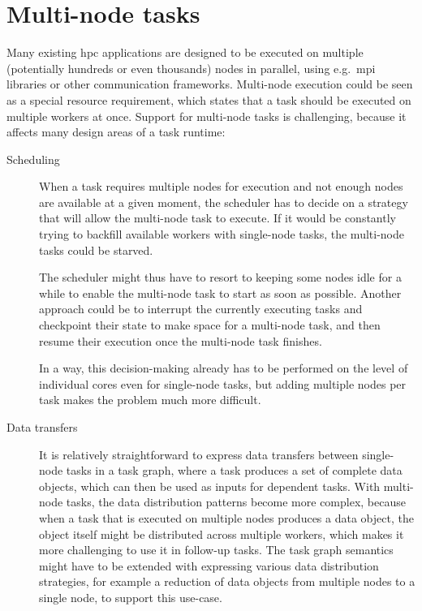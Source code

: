 \section{Multi-node tasks}
Many existing \gls{hpc} applications are designed to be executed on multiple
(potentially hundreds or even thousands) nodes in parallel, using e.g.\ \gls{mpi}
libraries or other communication frameworks. Multi-node execution could be seen as a special
resource requirement, which states that a task should be executed on multiple workers at once.
Support for multi-node tasks is challenging, because it affects many design areas of a task
runtime:
\begin{description}
	\item[Scheduling] When a task requires multiple nodes for execution and not enough nodes are available at a given
		moment, the scheduler has to decide on a strategy that will allow the multi-node task to execute.
		If it would be constantly trying to backfill available workers with single-node tasks, the
		multi-node tasks could be starved.

		The scheduler might thus have to resort to keeping some nodes idle for a while to enable the
		multi-node task to start as soon as possible. Another approach could be to interrupt the currently
		executing tasks and checkpoint their state to make space for a multi-node task, and then resume
		their execution once the multi-node task finishes.

		In a way, this decision-making already has to be performed on the level of individual cores even
		for single-node tasks, but adding multiple nodes per task makes the problem much more difficult.
	\item[Data transfers] It is relatively straightforward to express data transfers between single-node tasks in a task
		graph, where a task produces a set of complete data objects, which can then be used as inputs for
		dependent tasks. With multi-node tasks, the data distribution patterns become more complex, because
		when a task that is executed on multiple nodes produces a data object, the object itself might be
		distributed across multiple workers, which makes it more challenging to use it in follow-up tasks.
		The task graph semantics might have to be extended with expressing various data distribution
		strategies, for example a reduction of data objects from multiple nodes to a single node, to
		support this use-case.


\end{description}
